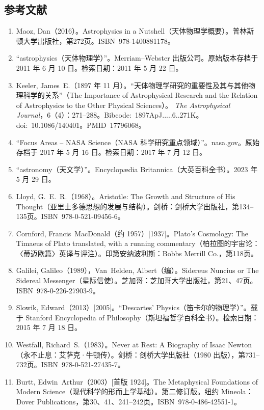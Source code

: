 \subsection{参考文献}
\begin{enumerate}
  \item Maoz, Dan（2016）。Astrophysics in a Nutshell（天体物理学概要）。普林斯顿大学出版社，第272页。ISBN~978-1400881178。
  \item “astrophysics（天体物理学）”。Merriam–Webster 出版公司。原始版本存档于 2011 年 6 月 10 日。检索日期：2011 年 5 月 22 日。
  \item Keeler, James~E.（1897 年 11 月）。“天体物理学研究的重要性及其与其他物理科学的关系”（The Importance of Astrophysical Research and the Relation of Astrophysics to the Other Physical Sciences）。  
  \textit{The Astrophysical Journal}，6（4）：271–288。Bibcode:~1897ApJ.....6..271K。doi:~10.1086/140401。PMID~17796068。
  \item “Focus Areas – NASA Science（NASA 科学研究重点领域）”。nasa.gov。原始存档于 2017 年 5 月 16 日。检索日期：2017 年 7 月 12 日。
  \item “astronomy（天文学）”。Encyclopædia Britannica（大英百科全书）。2023 年 5 月 29 日。
  \item Lloyd, G.~E.~R.（1968）。Aristotle: The Growth and Structure of His Thought（亚里士多德思想的发展与结构）。剑桥：剑桥大学出版社，第134–135页。ISBN~978-0-521-09456-6。
  \item Cornford, Francis~MacDonald（约 1957）[1937]。Plato's Cosmology: The Timaeus of Plato translated, with a running commentary（柏拉图的宇宙论：〈蒂迈欧篇〉英译与评注）。印第安纳波利斯：Bobbs Merrill Co.，第118页。
  \item Galilei, Galileo（1989），Van~Helden, Albert（编）。Sidereus Nuncius or The Sidereal Messenger（星际信使）。芝加哥：芝加哥大学出版社，第21、47页。ISBN~978-0-226-27903-9。
  \item Slowik, Edward（2013）[2005]。“Descartes’ Physics（笛卡尔的物理学）”。载于 Stanford Encyclopedia of Philosophy（斯坦福哲学百科全书）。检索日期：2015 年 7 月 18 日。
  \item Westfall, Richard~S.（1983）。Never at Rest: A Biography of Isaac Newton（永不止息：艾萨克·牛顿传）。剑桥：剑桥大学出版社（1980 出版），第731–732页。ISBN~978-0-521-27435-7。
  \item Burtt, Edwin~Arthur（2003）[首版 1924]。The Metaphysical Foundations of Modern Science（现代科学的形而上学基础）。第二修订版。纽约 Mineola：Dover Publications，第30、41、241–242页。ISBN~978-0-486-42551-1。

\end{enumerate}
